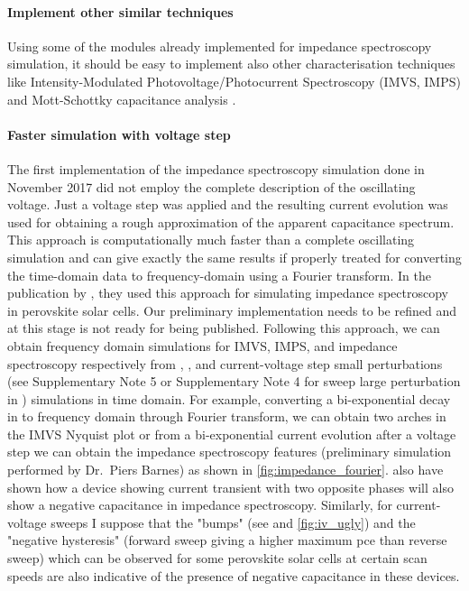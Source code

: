 	\paragraph{Implement other similar techniques}
	Using some of the modules already implemented for impedance spectroscopy simulation, it should be easy to implement also other characterisation techniques like Intensity-Modulated Photovoltage/Photocurrent Spectroscopy (IMVS, IMPS) \cite{Pockett2015,Guillen2014} and Mott-Schottky capacitance analysis \cite{Almora2016}.

	\paragraph{Faster simulation with voltage step}\label{impedance_fourier}
	The first implementation of the impedance spectroscopy simulation done in November 2017 did not employ the complete description of the oscillating voltage.
	Just a voltage step was applied and the resulting current evolution was used for obtaining a rough approximation of the apparent capacitance spectrum.
	This approach is computationally much faster than a complete oscillating simulation and can give exactly the same results if properly treated for converting the time\hyp{}domain data to frequency\hyp{}domain using a Fourier transform.
	In the publication by , they used this approach for simulating impedance spectroscopy in perovskite solar cells.
	Our preliminary implementation needs to be refined and at this stage is not ready for being published.
	Following this approach, we can obtain frequency domain simulations for IMVS, IMPS, and impedance spectroscopy respectively from , , and current\hyp{}voltage step small perturbations (see Supplementary Note 5 or Supplementary Note 4 for sweep large perturbation in ) simulations in time domain.
	For example, converting a bi\hyp{}exponential decay in  to frequency domain through Fourier transform, we can obtain two arches in the IMVS Nyquist plot or from a bi\hyp{}exponential current evolution after a voltage step we can obtain the impedance spectroscopy features (preliminary simulation performed by Dr.\ Piers Barnes) as shown in \cref{fig:impedance_fourier}.
	 also have shown how a device showing current transient with two opposite phases will also show a negative capacitance in impedance spectroscopy.
	Similarly, for current\hyp{}voltage sweeps I suppose that the "bumps" (see  and \cref{fig:iv_ugly}) and the "negative hysteresis" (forward sweep giving a higher maximum \gls{pce} than reverse sweep) which can be observed for some perovskite solar cells at certain scan speeds are also indicative of the presence of negative capacitance in these devices.

